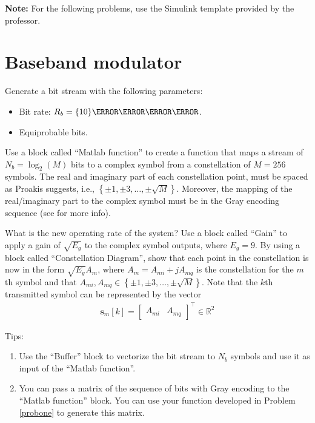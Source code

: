 \documentclass[12pt,a4paper]{article}
\begin{document}
\textbf{Note:} For the following problems, use the Simulink template provided by the professor.

\section{Baseband modulator}

\problem \label{probtwo}
Generate a bit stream with the following parameters:
\begin{itemize}
    \item Bit rate: \(R_b = \qty{10}{\mega\bit\per\second}\).
    \item Equiprobable bits.
\end{itemize}

\problem \label{probthree}
Use a block called ``Matlab function'' to create a function that maps a stream of \(N_b = \log_2\left( M \right)\) bits to a complex symbol from a constellation of \(M=256\) symbols. The real and imaginary part of each constellation point, must be spaced as Proakis suggests, i.e., \(\left\{ \pm1, \pm3, \dots, \pm\sqrt{M} \right\}\). Moreover, the mapping of the real/imaginary part to the complex symbol must be in the Gray encoding sequence (see \cite{proakisDigitalCommunications2007} for more info).

\subproblem What is the new operating rate of the system?
\subproblem Use a block called ``Gain'' to apply a gain of \(\sqrt{E_g}\) to the complex symbol outputs, where \(E_g = 9\).
\subproblem By using a block called ``Constellation Diagram'', show that each point in the constellation is now in the form \(\sqrt{E_g} A_m\), where \(A_m = A_{mi}+j A_{mq}\) is the constellation for the \(m\)th symbol and that \(A_{mi}, A_{mq} \in \left\{ \pm1, \pm3, \dots, \pm\sqrt{M} \right\}\). Note that the \(k\)th transmitted symbol can be represented by the vector
\begin{align}
    \mathbf{s}_m\left[ k \right] = \begin{bmatrix}
        A_{mi} & A_{mq}
    \end{bmatrix}^\top \in \mathbb{R}^{2}
\end{align}

Tips:
\begin{enumerate}
    \item Use the ``Buffer'' block to vectorize the bit stream to \(N_b\) symbols and use it as input of the ``Matlab function''.
    \item You can pass a matrix of the sequence of bits with Gray encoding to the ``Matlab function'' block. You can use your function developed in Problem \ref{probone} to generate this matrix.
\end{enumerate}
\end{document}
